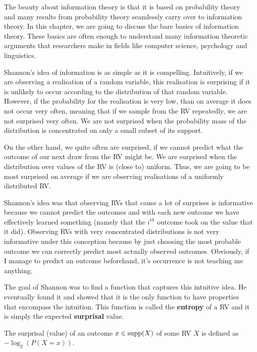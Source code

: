 The beauty about information theory is that it is based on probability theory and many results from probability theory seamlessly carry over to information theory.
In this chapter, we are going to discuss the bare basics of information theory. These basics are often enough to understand many information theoretic arguments
that researchers make in fields like computer science, psychology and linguistics.

Shannon's idea of information is as simple as it is compelling. Intuitively, if we are observing a realisation of a random variable, this realisation is surprising
if it is unlikely to occur according to the distribution of that random variable. However, if the probability for the realisation is very low, than on average it
does not occur very often, meaning that if we sample from the RV repeatedly, we are not surprised very often. We are not surprised when the probability
mass of the distribution is concentrated on only a small subset of its support. 

On the other hand, we quite often are surprised,
if we cannot predict what the outcome of our next draw from the RV might be. We are surprised when the distribution over values of the RV is (close to) uniform. Thus,
we are going to be most surprised on average if we are observing realisations of a uniformly distributed RV.

Shannon's idea was that observing RVs that cause a lot of surprises is informative because we cannot predict the outcomes and with each new outcome we have effectively
learned something  (namely that the $ i^{th} $ outcome took on the value that it did). Observing RVs with very concentrated distributions is not very informative
under this conception because by just choosing the most probable outcome we can correctly predict most actually observed outcomes. Obviously, if I manage to predict
an outcome beforehand, it's occurrence is not teaching me anything.

The goal of Shannon was to find a function that captures this intuitive idea. He eventually found it and showed that it is the only function to have properties
that encompass the intuition. This function is called the \textbf{entropy} of a RV and it is simply the expected \textbf{surprisal} value.

\begin{Definition}[Surprisal]
The surprisal (value) of an outcome $ x \in \operatorname{supp}(X) $ of some RV $ X $ is defined as $ -\log_{2}(P(X=x))$.
\end{Definition} 

